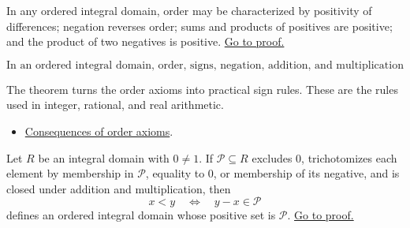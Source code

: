 \begin{theorem}
\label{thm:men-order-positivity}
In any ordered integral domain, order may be characterized by positivity of
differences; negation reverses order; sums and products of positives are
positive; and the product of two negatives is positive.
\hyperref[prf:men-order-positivity]{Go to proof.}
\end{theorem}

\begin{remark*}
\[
  \text{In an ordered integral domain, order, signs, negation, addition, and
  multiplication interact by the standard positivity laws.}
\]
\end{remark*}

\begin{remark*}[Interpretation]
The theorem turns the order axioms into practical sign rules. These are the
rules used in integer, rational, and real arithmetic.
\end{remark*}

\begin{dependencies}
\begin{itemize}
  \item \hyperref[thm:men-order-axiom-consequences]{Consequences of order axioms}.
\end{itemize}
\end{dependencies}

\begin{theorem}
\label{thm:men-pos-set}
Let \(R\) be an integral domain with \(0\neq 1\). If
\(\mathcal{P}\subseteq R\) excludes \(0\), trichotomizes each element by
membership in \(\mathcal{P}\), equality to \(0\), or membership of its
negative, and is closed under addition and multiplication, then
\[
  x<y \quad\Longleftrightarrow\quad y-x\in\mathcal{P}
\]
defines an ordered integral domain whose positive set is \(\mathcal{P}\).
\hyperref[prf:men-pos-set]{Go to proof.}
\end{theorem}

